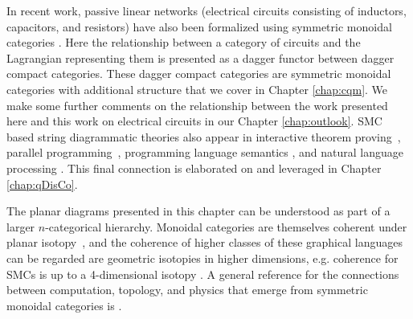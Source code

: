 In recent work, passive linear networks (electrical circuits consisting of inductors, capacitors, and resistors) have also been formalized using symmetric monoidal categories \cite{baez2015compositional}. Here the relationship between a category of circuits and the Lagrangian representing them is presented as a dagger functor between dagger compact categories. These dagger compact categories are symmetric monoidal categories with additional structure that we cover in Chapter \ref{chap:cqm}.  We make some further comments on the relationship between the work presented here and this work on electrical circuits in our Chapter \ref{chap:outlook}. SMC based string diagrammatic theories also appear in interactive theorem proving~\cite{grov2014tinker}, parallel programming~\cite{michaelson2012reasoning}, programming language semantics \cite{mellies2014local}, and natural language processing \cite{coecke2010mathematical}. This final connection is elaborated on and leveraged in Chapter \ref{chap:qDisCo}.

The planar diagrams presented in this chapter can be understood as part of a larger $n$-categorical hierarchy. Monoidal categories are themselves coherent under planar isotopy~\cite{joyal1991geometry}, and the coherence of higher classes of these graphical languages can be regarded are geometric isotopies in higher dimensions, e.g. coherence for SMCs is up to a 4-dimensional isotopy \cite{selinger2011survey}. 
A general reference for the connections between computation, topology, and physics that emerge from symmetric monoidal categories is \cite{baez2011physics}.

